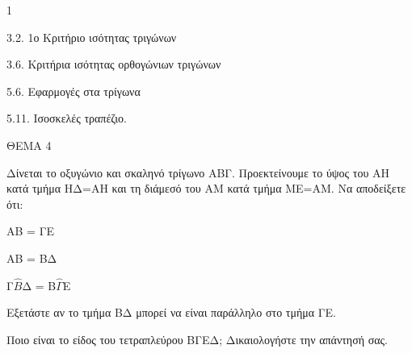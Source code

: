 \begin{ylh}{1}
    \item 3.2. 1ο Κριτήριο ισότητας τριγώνων
    \item 3.6. Κριτήρια ισότητας ορθογώνιων τριγώνων
    \item 5.6. Εφαρμογές στα τρίγωνα
    \item 5.11. Ισοσκελές τραπέζιο.
\end{ylh}

ΘΕΜΑ 4

Δίνεται το οξυγώνιο και σκαληνό τρίγωνο ΑΒΓ. Προεκτείνουμε το ύψος του ΑΗ κατά τμήμα ΗΔ=ΑΗ και τη διάμεσό του ΑΜ κατά τμήμα ΜΕ=ΑΜ. Να αποδείξετε ότι:\\
\begin{alist}
\item ΑΒ = ΓΕ
\item ΑΒ = ΒΔ 

\item Γ$\widehat{Β}$Δ = Β$\widehat{\Gamma}$Ε 

\item Εξετάστε αν το τμήμα ΒΔ μπορεί να είναι παράλληλο στο τμήμα ΓΕ. 

\item Ποιο είναι το είδος του τετραπλεύρου ΒΓΕΔ; Δικαιολογήστε την απάντησή σας. 


\begin{center}
\end{center}
\end{alist}
